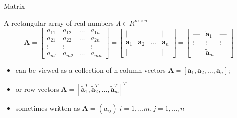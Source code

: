 \documentclass{scrartcl}
\def\tightlist{}
\newcommand{\vv}[1]{\boldsymbol{#1}}
\begin{document}
\begin{frame}{Matrix}
\protect\hypertarget{matrix}{}

A rectangular array of real numbers \(A\in R^{m\times n}\)
\[\vv{A} = \begin{bmatrix}
a_{11} & a_{12} & \ldots & a_{1n}\\
a_{21} & a_{22} & \ldots & a_{2n} \\
\vdots & \vdots & & \vdots \\
a_{m1} & a_{m2} & \ldots & a_{mn}
\end{bmatrix}  = \begin{bmatrix}
\vert & \vert &  & \vert\\
\vv{a}_1 & \vv{a}_2 & \ldots & \vv{a}_{n} \\
\vert & \vert & & \vert 
\end{bmatrix} = \begin{bmatrix}
\text{---} & \vv{\tilde{a}}_1 & \text{---}\\
\vdots & \vdots & \vdots  \\
\text{---} & \vv{\tilde{a}}_m & \text{---}
\end{bmatrix} \]

\begin{itemize}
\tightlist
\item
  can be viewed as a collection of n column vectors
  \(\vv{A} = [\vv{a}_1, \vv{a}_2, \ldots, \vv{a}_n]\);
\item
  or row vectors
  \(\vv{A} = [\vv{\tilde{a}}_1^T, \vv{\tilde{a}}_2^T, \ldots, \vv{\tilde{a}}_m^T]^T\)
\item
  sometimes written as \(\vv{A} = (a_{ij})\)
  \(i= 1,\ldots m, j= 1,\ldots, n\)
\end{itemize}

\end{frame}
\end{document}
